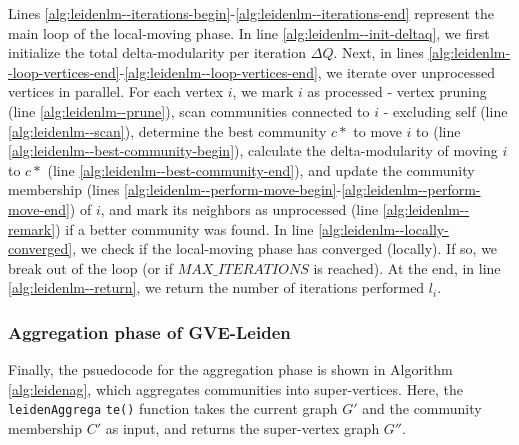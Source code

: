 Lines \ref{alg:leidenlm--iterations-begin}-\ref{alg:leidenlm--iterations-end} represent the main loop of the local-moving phase. In line \ref{alg:leidenlm--init-deltaq}, we first initialize the total delta-modularity per iteration $\Delta Q$. Next, in lines \ref{alg:leidenlm--loop-vertices-end}-\ref{alg:leidenlm--loop-vertices-end}, we iterate over unprocessed vertices in parallel. For each vertex $i$, we mark $i$ as processed - vertex pruning (line \ref{alg:leidenlm--prune}), scan communities connected to $i$ - excluding self (line \ref{alg:leidenlm--scan}), determine the best community $c*$ to move $i$ to (line \ref{alg:leidenlm--best-community-begin}), calculate the delta-modularity of moving $i$ to $c*$ (line \ref{alg:leidenlm--best-community-end}), and update the community membership  (lines \ref{alg:leidenlm--perform-move-begin}-\ref{alg:leidenlm--perform-move-end}) of $i$, and mark its neighbors as unprocessed (line \ref{alg:leidenlm--remark}) if a better community was found. In line \ref{alg:leidenlm--locally-converged}, we check if the local-moving phase has converged (locally). If so, we break out of the loop (or if $MAX\_ITERATIONS$ is reached). At the end, in line \ref{alg:leidenlm--return}, we return the number of iterations performed $l_i$.


\subsubsection{Aggregation phase of GVE-Leiden}

Finally, the psuedocode for the aggregation phase is shown in Algorithm \ref{alg:leidenag}, which aggregates communities into super-vertices. Here, the \texttt{leidenAggrega} \texttt{te()} function takes the current graph $G'$ and the community membership $C'$ as input, and returns the super-vertex graph $G''$.

